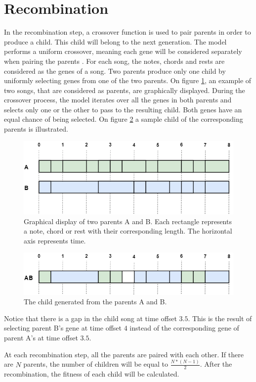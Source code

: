 \section{Recombination}
In the recombination step, a crossover function is used to pair parents in order to produce a child. This child will belong to the next generation. The model performs a uniform crossover, meaning each gene will be considered separately when pairing the parents \cite{BOOK:GA}. For each song, the notes, chords and rests are considered as the genes of a song. Two parents produce only one child by uniformly selecting genes from one of the two parents. 
On figure \ref{fig:cross_init}, an example of two songs, that are considered as parents, are graphically displayed. During the crossover process, the model iterates over all the genes in both parents and selects only one or the other to pass to the resulting child. Both genes have an equal chance of being selected. On figure \ref{fig:cross_7} a sample child of the corresponding parents is illustrated.
\begin{figure}[H]
    \includegraphics[width=\linewidth]{Fotos/crossover/init.png}
	\caption{Graphical display of two parents A and B. Each rectangle represents a note, chord or rest with their corresponding length. The horizontal axis represents time.}
	\label{fig:cross_init}
\end{figure}
\begin{figure}[H]
\includegraphics[width=\linewidth]{Fotos/crossover/last.png}
\caption{The child generated from the parents A and B.}
\label{fig:cross_7}
\end{figure}
Notice that there is a gap in the child song at time offset $3.5$. This is the result of selecting parent B's gene at time offset $4$ instead of the corresponding gene of parent A's at time offset $3.5$. 

At each recombination step, all the parents are paired with each other. If there are \(N\) parents, the number of children will be equal to \( \frac{N * (N-1)}{2} \). After the recombination, the fitness of each child will be calculated.